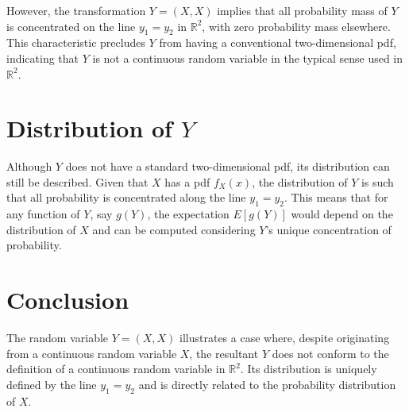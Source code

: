 \documentclass{article}
\begin{document}
However, the transformation $Y = (X, X)$ implies that all probability mass of $Y$ is concentrated on the line $y_1 = y_2$ in $\mathbb{R}^2$, with zero probability mass elsewhere. This characteristic precludes $Y$ from having a conventional two-dimensional pdf, indicating that $Y$ is not a continuous random variable in the typical sense used in $\mathbb{R}^2$.

\section*{Distribution of \(Y\)}

Although $Y$ does not have a standard two-dimensional pdf, its distribution can still be described. Given that $X$ has a pdf $f_X(x)$, the distribution of $Y$ is such that all probability is concentrated along the line $y_1 = y_2$. This means that for any function of $Y$, say $g(Y)$, the expectation $E[g(Y)]$ would depend on the distribution of $X$ and can be computed considering $Y$'s unique concentration of probability.

\section*{Conclusion}

The random variable $Y = (X, X)$ illustrates a case where, despite originating from a continuous random variable $X$, the resultant $Y$ does not conform to the definition of a continuous random variable in $\mathbb{R}^2$. Its distribution is uniquely defined by the line $y_1 = y_2$ and is directly related to the probability distribution of $X$.
\end{document}
